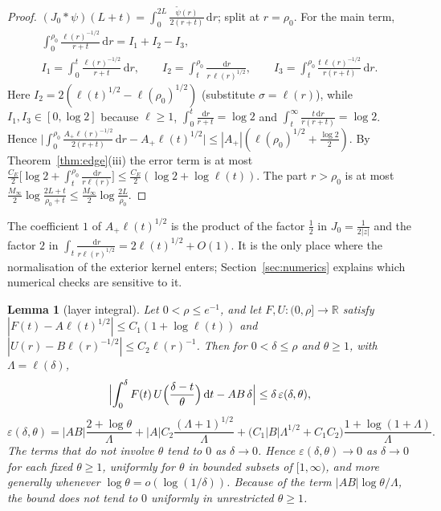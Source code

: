 \documentclass[11pt]{amsart}
\newcommand{\R}{\mathbb{R}}
\newcommand{\eps}{\varepsilon}
\newcommand{\dd}{\,\mathrm{d}}
\newtheorem{lemma}[theorem]{Lemma}
\theoremstyle{definition}
\theoremstyle{remark}
\numberwithin{equation}{section}
\begin{document}
\begin{proof}
$(J_0*\psi)(L+t)=\int_0^{2L}\frac{\tilde\psi(r)}{2(r+t)}\dd r$; split at $r=\rho_0$. For the main term,
\begin{gather*}
\int_0^{\rho_0}\frac{\ell(r)^{-1/2}}{r+t}\dd r=I_1+I_2-I_3,\\
I_1=\int_0^t\frac{\ell(r)^{-1/2}}{r+t}\dd r,\qquad I_2=\int_t^{\rho_0}\frac{\dd r}{r\,\ell(r)^{1/2}},\qquad I_3=\int_t^{\rho_0}\frac{t\,\ell(r)^{-1/2}}{r(r+t)}\dd r .
\end{gather*}
Here $I_2=2(\ell(t)^{1/2}-\ell(\rho_0)^{1/2})$ (substitute $\sigma=\ell(r)$), while $I_1,I_3\in[0,\log2]$ because $\ell\ge1$, $\int_0^t\frac{\dd r}{r+t}=\log2$ and $\int_t^\infty\frac{t\dd r}{r(r+t)}=\log2$. Hence $\bigl|\int_0^{\rho_0}\frac{A_+\ell(r)^{-1/2}}{2(r+t)}\dd r-A_+\ell(t)^{1/2}\bigr|\le|A_+|(\ell(\rho_0)^{1/2}+\frac{\log2}2)$. By Theorem~\ref{thm:edge}(iii) the error term is at most $\frac{C_E}2\bigl[\log2+\int_t^{\rho_0}\frac{\dd r}{r\ell(r)}\bigr]\le\frac{C_E}2(\log2+\log\ell(t))$. The part $r>\rho_0$ is at most $\frac{M_\infty}2\log\frac{2L+t}{\rho_0+t}\le\frac{M_\infty}2\log\frac{2L}{\rho_0}$.
\end{proof}

The coefficient $1$ of $A_+\ell(t)^{1/2}$ is the product of the factor $\frac12$ in $J_0=\frac1{2|z|}$ and the factor $2$ in $\int_t\frac{\dd r}{r\ell(r)^{1/2}}=2\ell(t)^{1/2}+O(1)$. It is the only place where the normalisation of the exterior kernel enters; Section~\ref{sec:numerics} explains which numerical checks are sensitive to it.

\begin{lemma}[layer integral]\label{lem:layer}
Let $0<\rho\le e^{-1}$, and let $F,U:(0,\rho]\to\R$ satisfy $|F(t)-A\ell(t)^{1/2}|\le C_1(1+\log\ell(t))$ and $|U(r)-B\ell(r)^{-1/2}|\le C_2\ell(r)^{-1}$. Then for $0<\delta\le\rho$ and $\theta\ge1$, with $\Lambda=\ell(\delta)$,
\[
\Bigl|\int_0^\delta F(t)\,U\Bigl(\frac{\delta-t}\theta\Bigr)\dd t-AB\,\delta\Bigr|\le\delta\,\eps(\delta,\theta),
\]
\[
\eps(\delta,\theta)=|AB|\frac{2+\log\theta}{\Lambda}+|A|C_2\frac{(\Lambda+1)^{1/2}}{\Lambda}+\bigl(C_1|B|\Lambda^{1/2}+C_1C_2\bigr)\frac{1+\log(1+\Lambda)}{\Lambda}.
\]
The terms that do not involve $\theta$ tend to $0$ as $\delta\to0$. Hence $\eps(\delta,\theta)\to0$ as $\delta\to0$ for each fixed $\theta\ge1$, uniformly for $\theta$ in bounded subsets of $[1,\infty)$, and more generally whenever $\log\theta=o(\log(1/\delta))$. Because of the term $|AB|\log\theta/\Lambda$, the bound does not tend to $0$ uniformly in unrestricted $\theta\ge1$.
\end{lemma}
\end{document}
